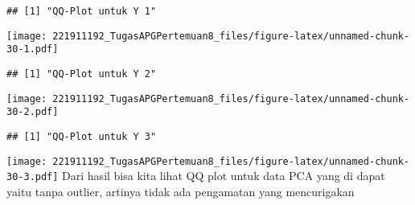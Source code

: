 \documentclass[
]{article}
\begin{document}
\begin{verbatim}
## [1] "QQ-Plot untuk Y 1"
\end{verbatim}

\texttt{[image: 221911192\_TugasAPGPertemuan8\_files/figure-latex/unnamed-chunk-30-1.pdf]}

\begin{verbatim}
## [1] "QQ-Plot untuk Y 2"
\end{verbatim}

\texttt{[image: 221911192\_TugasAPGPertemuan8\_files/figure-latex/unnamed-chunk-30-2.pdf]}

\begin{verbatim}
## [1] "QQ-Plot untuk Y 3"
\end{verbatim}

\texttt{[image: 221911192\_TugasAPGPertemuan8\_files/figure-latex/unnamed-chunk-30-3.pdf]}
Dari hasil bisa kita lihat QQ plot untuk data PCA yang di dapat yaitu
tanpa outlier, artinya tidak ada pengamatan yang mencurigakan
\end{document}
